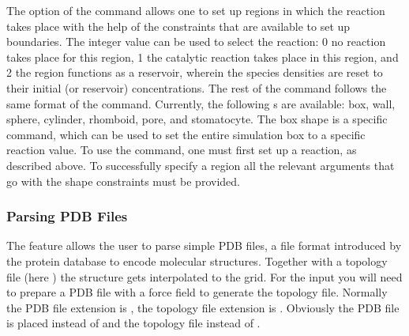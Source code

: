 \begin{essyntax}
  \begin{features}
  \end{features}
\end{essyntax}
The  option of the  command allows one 
to set up regions in which the reaction takes place with the help of the 
constraints that are available to set up boundaries. The integer value 
 can be used to select the reaction: 0 no reaction takes
place for this region, 1 the catalytic reaction takes place in this region, and 
2 the region functions as a reservoir, wherein the species densities are reset
to their initial (or reservoir) concentrations. The rest of the command follows 
the same format of the  command. Currently, the 
following s are available: box, wall, sphere, cylinder, rhomboid, 
pore, and stomatocyte. The box shape is a  specific command, which
can be used to set the entire simulation box to a specific reaction value. To
use the  command, one must first set up
a reaction, as described above. To successfully specify a region all the 
relevant arguments that go with the shape constraints must be provided.

\subsubsection{\label{sssec:ek-pdb-parse}Parsing PDB Files}

\begin{essyntax}
  \begin{features}
  \end{features}
\end{essyntax}
The  feature allows the user to parse simple PDB files, a file format introduced by the protein database to encode molecular structures. Together with a topology file (here ) the structure gets interpolated to the  grid. For the input you will need to prepare a PDB file with a  force field to generate the topology file. Normally the PDB file extension is , the topology file extension is . Obviously the PDB file is placed instead of  and the topology file instead of . 

